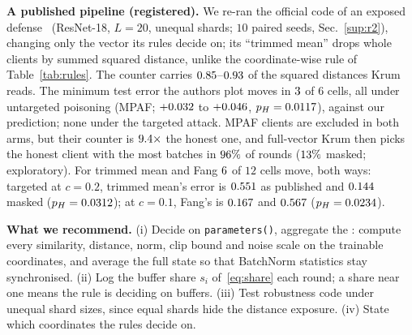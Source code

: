 \documentclass[journal]{IEEEtran}
\begin{document}
\textbf{A published pipeline (registered).} We re-ran the official code of an exposed
defense~\cite{lee2024triplet} (ResNet-18, $L=20$, unequal shards; $10$ paired
seeds, Sec.~\ref{sup:r2}), changing only the vector its rules decide on; its ``trimmed mean'' drops
whole clients by summed squared distance, unlike the coordinate-wise rule of Table~\ref{tab:rules}. The counter carries
$0.85$--$0.93$ of the squared distances Krum reads. The
minimum test error the authors plot moves in $3$ of $6$ cells, all under
untargeted poisoning (MPAF; $+0.032$ to $+0.046$,
$p_H=0.0117$), against our prediction; none under the targeted attack. MPAF
clients are excluded in both arms, but their counter is $9.4\times$ the
honest one, and full-vector Krum then picks the honest client with the most batches in
$96\%$ of rounds ($13\%$ masked; exploratory). For trimmed
mean and Fang $6$ of $12$ cells move, both ways: targeted at $c=0.2$, trimmed mean's
error is $0.551$ as published and $0.144$ masked ($p_H=0.0312$);
at $c=0.1$, Fang's is $0.167$ and $0.567$ ($p_H=0.0234$).

\textbf{What we recommend.} (i) Decide on \texttt{parameters()}, aggregate the
\sd{}: compute every similarity, distance, norm, clip bound and noise scale on the
trainable coordinates, and average the full state so that BatchNorm statistics stay
synchronised. (ii) Log the buffer share $s_i$ of~\eqref{eq:share} each round; a
share near one means the rule is deciding on buffers. (iii) Test robustness
code under unequal shard sizes, since equal shards hide the distance exposure.
(iv) State which coordinates the rules decide on.
\end{document}
